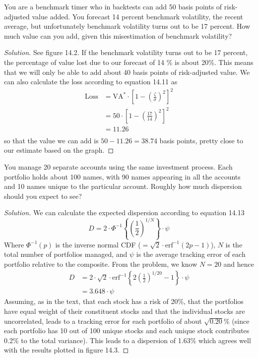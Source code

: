 \begin{problem}{14.4}
  You are a benchmark timer who in backtests can add 50 basis points of risk-adjusted value added. You forecast 14 percent benchmark volatility, the recent average, but unfortunately benchmark volatility turns out to be 17 percent. How much value can you add, given this misestimation of benchmark volatility?
\end{problem}

\begin{proof}[Solution]
  See figure 14.2. If the benchmark volatility turns out to be 17 percent, the percentage of value lost due to our forecast of 14 \% is about 20\%. This means that we will only be able to add about 40 basis points of risk-adjusted value. We can also calculate the loss according to equation 14.11 as
  \begin{align*}
   \mathrm{Loss} &= \mathrm{VA}^{*}\cdot \left[ 1 - \left(\frac{\zeta}{\sigma}\right)^{2}\right]^{2}\\
		 &= 50 \cdot \left[ 1  -\left(\frac{17}{14}\right)^{2}\right]^{2}\\
		 &= 11.26\\
  \end{align*}
  so that the value we can add is $50-11.26=38.74$ basis points, pretty close to our estimate based on the graph.
\end{proof}

\begin{problem}{14.5}
  You manage 20 separate accounts using the same investment process. Each portfolio holds about 100 names, with 90 names appearing in all the accounts and 10 names unique to the particular account. Roughly how much dispersion should you expect to see?
\end{problem}

\begin{proof}[Solution]
  We can calculate the expected dispersion according to equation 14.13
  \begin{equation*}
   D=2\cdot\Phi^{-1} \left\{\left(\frac{1}{2}\right)^{1/N}\right\}  \cdot \psi
  \end{equation*}
  Where $\Phi^{-1}(p)$ is the inverse normal CDF ($=\sqrt{2}\cdot\mathrm{erf}^{-1}(2p-1)$), $N$ is the total number of portfolios managed, and $\psi$ is the average tracking error of each portfolio relative to the composite. From the problem, we know $N=20$ and hence
  \begin{align*}
   D&=2\cdot\sqrt{2}\cdot\mathrm{erf}^{-1}\left\{2\left(\frac{1}{2}\right)^{1/20}-1\right\}\cdot \psi\\
    &=3.648 \cdot \psi
  \end{align*}
  Assuming, as in the text, that each stock has a risk of 20\%, that the portfolios have equal weight of their constituent stocks and that the individual stocks are uncorrelated, leads to a tracking error for each portfolio of about $\sqrt{0.20}\%$ (since each portfolio has 10 out of 100 unique stocks and each unique stock contributes 0.2\% to the total variance). This leads to a dispersion of 1.63\% which agrees well with the results plotted in figure 14.3.
\end{proof}
